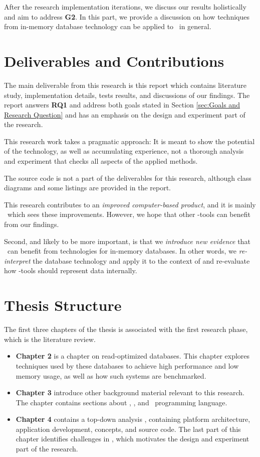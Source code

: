 After the research implementation iterations, we discuss our results holistically and aim to address \textbf{G2}. In this part, we provide a discussion on how techniques from in-memory database technology can be applied to \mde~in general. 

\section{Deliverables and Contributions}
\label{sec:Deliverables and Contributions}
The main deliverable from this research is this report which contains literature study, implementation details, tests results, and discussions of our findings. The report answers \textbf{RQ1} and address both goals stated in Section \ref{sec:Goals and Research Question} and has an emphasis on the design and experiment part of the research. 

This research work takes a pragmatic approach: It is meant to show the potential of the technology, as well as accumulating experience, not a thorough analysis and experiment that checks all aspects of the applied methods. 

The source code is not a part of the deliverables for this research, although class diagrams and some listings are provided in the report.

This research contributes to an \textit{improved computer-based product}, and it is mainly \gap~which sees these improvements. However, we hope that other \mde-tools can benefit from our findings. 

Second, and likely to be more important, is that we \textit{introduce new evidence} that \mde~can benefit from technologies for in-memory databases. In other words, we \textit{re-interpret} the database technology and apply it to the context of \mde and re-evaluate how \mdd-tools should represent data internally.


\section{Thesis Structure}
\label{sec:Thesis Structure}
The first three chapters of the thesis is associated with the first research phase, which is the literature review.
\begin{itemize}
  \item \textbf{Chapter 2} is a chapter on read-optimized databases. This chapter explores techniques used by these databases to achieve high performance and low memory usage, as well as how such systems are benchmarked. 
  \item \textbf{Chapter 3} introduce other background material relevant to this research. The chapter contains sections about \mde, \bd, and \delphi~programming language.
  \item \textbf{Chapter 4} contains a top-down analysis \gap, containing platform architecture, application development, concepts, and source code. The last part of this chapter identifies challenges in \gap, which motivates the design and experiment part of the research.
\end{itemize}

